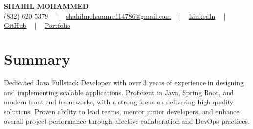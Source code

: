 \documentclass[letterpaper,10pt]{article}
\begin{document}
\begin{center}
    {\fontsize{14pt}{12pt}\selectfont \textbf{\MakeUppercase{Shahil Mohammed}}}\\ \vspace{2pt}
    \fontsize{10pt}{12pt}\selectfont (832) 620-5379 ~ | ~ \href{mailto:shahilmohammed14786@gmail.com}{shahilmohammed14786@gmail.com} ~ | ~  
    \href{https://www.linkedin.com/in/shahil-mohammed-9652931a1/}{\color{blue}\underline{LinkedIn}}  ~ | ~ 
    \href{https://github.com/freakbeast14}{\color{blue}\underline{GitHub}} ~ | ~ 
    \href{https://shahil-mohammed.netlify.app/}{\color{blue}\underline{Portfolio}}
    \vspace{-8pt}
\end{center}

\section{Summary}
\vspace{-2pt}\fontsize{8pt}{9pt}\selectfont
Dedicated Java Fullstack Developer with over 3 years of experience in designing and implementing scalable applications. Proficient in Java, Spring Boot, and modern front-end frameworks, with a strong focus on delivering high-quality solutions. Proven ability to lead teams, mentor junior developers, and enhance overall project performance through effective collaboration and DevOps practices.
 \vspace{-5pt}
 
\vspace{-2pt}
\end{document}
